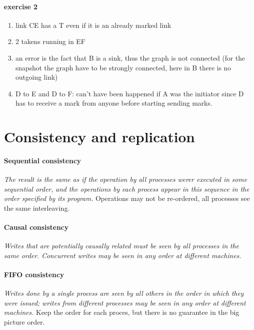 \documentclass[11pt]{article}
\begin{document}
\paragraph{exercise 2} %
\label{par:exercise_2}
\begin{enumerate}
	\item link CE has a T even if it is an already marked link
	\item 2 takens running in EF
	\item an error is the fact that B is a sink, thus the graph is not connected (for the snapshot the graph have to be strongly connected, here in B there is no outgoing link)
	\item D to E and D to F: can’t have been happened if A was the initiator since D has to receive a mark from anyone before starting sending marks.
\end{enumerate}

\section{Consistency and replication} %
\label{sec:consistency_and_replication}

\paragraph{Sequential consistency} %
\label{par:sequential_consistency}
\textit{The result is the same as if the operation by all processes werer executed in some sequential order, and the operations by each process appear in this sequence in the order specified by its program.}
Operations may not be re-ordered, all processes see the same interleaving.

\paragraph{Causal consistency} %
\label{par:causal_consistency}
\textit{Writes that are potentially causally related must be seen by all processes in the same order. Concurrent writes may be seen in any order at different machines.}

\paragraph{FIFO consistency} %
\label{par:fifo_consistency}
\textit{Writes done by a single process are seen by all others in the order in which they were issued; writes from different processes may be seen in any order at different machines.}
Keep the order for each proces, but there is no guarantee in the big picture order.
\end{document}
